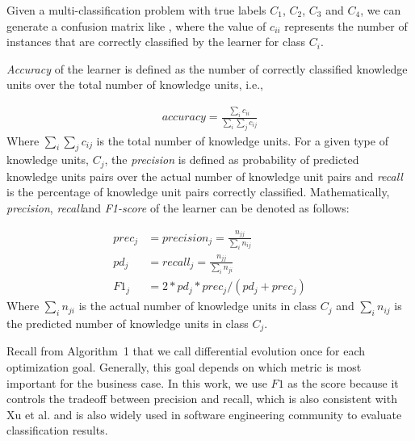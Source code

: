 Given a multi-classification problem with true labels $C_1$, 
$C_2$, $C_3$ and $C_4$, we can generate a confusion matrix like , 
where the value of $c_{ii}$ represents the number of instances that are correctly classified
by the learner for class $C_i$. 

{\it Accuracy} of the learner is defined as the number of  correctly
classified knowledge units over the total number of knowledge units, i.e.,


{\[
\begin{array}{ll}
accuracy = \frac{\sum_i c_{ii}}{\sum_{i}\sum_{j}c_{ij}}
\end{array}
\]}
Where ${\sum_{i}\sum_{j}c_{ij}}$ is the total number of knowledge units.
For a given type of knowledge units, $C_j$, the {\it precision} is defined as probability of
predicted knowledge units pairs over the actual number of knowledge unit pairs and
 {\it recall} is the percentage of knowledge unit pairs correctly classified. Mathematically,
  {\it precision}, {\it recall}and {\it F1-score} of 
the learner can be denoted as follows:

{\[
\begin{array}{ll}
prec_j &= precision_j = \frac{n_{jj}}{\sum_{i}n_{ij}}\\
pd_j &= recall_j = \frac{n_{jj}}{\sum_{i}n_{ji}}\\ 
F1_{j} &= 2*pd_j*prec_j/(pd_j + prec_j)
\end{array}
\]}
Where ${\sum_{i}n_{ji}}$ is the actual number of knowledge units in class $C_j$
and $\sum_{i}n_{ij}$ is the predicted number of knowledge units in class $C_j$.


Recall from Algorithm~1 that we call differential evolution once for each
optimization goal. Generally, this goal depends on which metric is most important for
the business case. In this work, we use $F1$ as the score because it controls
the tradeoff between precision and recall, which is also consistent with Xu et al.\cite{xu2016predicting}
and is also widely used in software engineering
community to evaluate classification results\cite{wang2016automatically,menzies2007data,fu2016tuning,kim2008classifying}.

